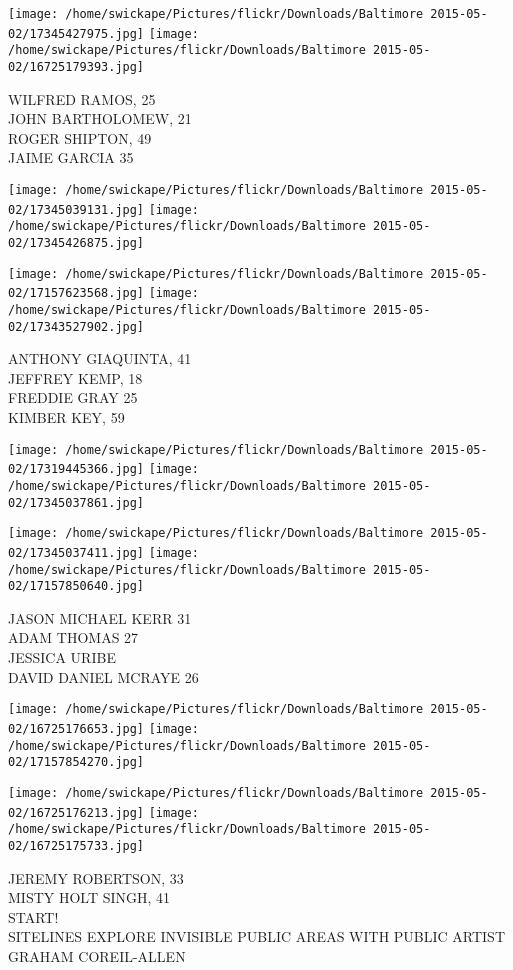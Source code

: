 \documentclass[10pt,letterpaper]{article}
\begin{document}
\texttt{[image: /home/swickape/Pictures/flickr/Downloads/Baltimore 2015-05-02/17345427975.jpg]}
\texttt{[image: /home/swickape/Pictures/flickr/Downloads/Baltimore 2015-05-02/16725179393.jpg]}

WILFRED RAMOS, 25\\
JOHN BARTHOLOMEW, 21\\
ROGER SHIPTON, 49\\
JAIME GARCIA 35
\pagebreak

\texttt{[image: /home/swickape/Pictures/flickr/Downloads/Baltimore 2015-05-02/17345039131.jpg]}
\texttt{[image: /home/swickape/Pictures/flickr/Downloads/Baltimore 2015-05-02/17345426875.jpg]}

\texttt{[image: /home/swickape/Pictures/flickr/Downloads/Baltimore 2015-05-02/17157623568.jpg]}
\texttt{[image: /home/swickape/Pictures/flickr/Downloads/Baltimore 2015-05-02/17343527902.jpg]}

ANTHONY GIAQUINTA, 41\\
JEFFREY KEMP, 18\\
FREDDIE GRAY 25\\
KIMBER KEY, 59
\pagebreak

\texttt{[image: /home/swickape/Pictures/flickr/Downloads/Baltimore 2015-05-02/17319445366.jpg]}
\texttt{[image: /home/swickape/Pictures/flickr/Downloads/Baltimore 2015-05-02/17345037861.jpg]}

\texttt{[image: /home/swickape/Pictures/flickr/Downloads/Baltimore 2015-05-02/17345037411.jpg]}
\texttt{[image: /home/swickape/Pictures/flickr/Downloads/Baltimore 2015-05-02/17157850640.jpg]}

JASON MICHAEL KERR 31\\
ADAM THOMAS 27\\
JESSICA URIBE\\
DAVID DANIEL MCRAYE 26
\pagebreak

\texttt{[image: /home/swickape/Pictures/flickr/Downloads/Baltimore 2015-05-02/16725176653.jpg]}
\texttt{[image: /home/swickape/Pictures/flickr/Downloads/Baltimore 2015-05-02/17157854270.jpg]}

\texttt{[image: /home/swickape/Pictures/flickr/Downloads/Baltimore 2015-05-02/16725176213.jpg]}
\texttt{[image: /home/swickape/Pictures/flickr/Downloads/Baltimore 2015-05-02/16725175733.jpg]}

JEREMY ROBERTSON, 33\\
MISTY HOLT SINGH, 41\\
START!\\
SITELINES EXPLORE INVISIBLE PUBLIC AREAS WITH PUBLIC ARTIST GRAHAM COREIL{-}ALLEN
\pagebreak
\end{document}
